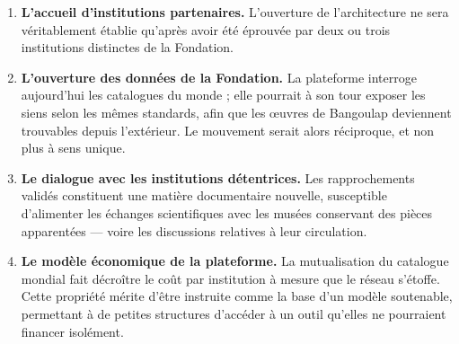 \begin{enumerate}
  \item \textbf{L'accueil d'institutions partenaires.} L'ouverture de
        l'architecture ne sera véritablement établie qu'après avoir été éprouvée
        par deux ou trois institutions distinctes de la Fondation.

  \item \textbf{L'ouverture des données de la Fondation.} La plateforme
        interroge aujourd'hui les catalogues du monde ; elle pourrait à son tour
        exposer les siens selon les mêmes standards, afin que les œuvres de
        Bangoulap deviennent trouvables depuis l'extérieur. Le mouvement serait
        alors réciproque, et non plus à sens unique.

  \item \textbf{Le dialogue avec les institutions détentrices.} Les
        rapprochements validés constituent une matière documentaire nouvelle,
        susceptible d'alimenter les échanges scientifiques avec les musées
        conservant des pièces apparentées — voire les discussions relatives à
        leur circulation.

  \item \textbf{Le modèle économique de la plateforme.} La mutualisation du
        catalogue mondial fait décroître le coût par institution à mesure que le
        réseau s'étoffe. Cette propriété mérite d'être instruite comme la base
        d'un modèle soutenable, permettant à de petites structures d'accéder à
        un outil qu'elles ne pourraient financer isolément.
\end{enumerate}
